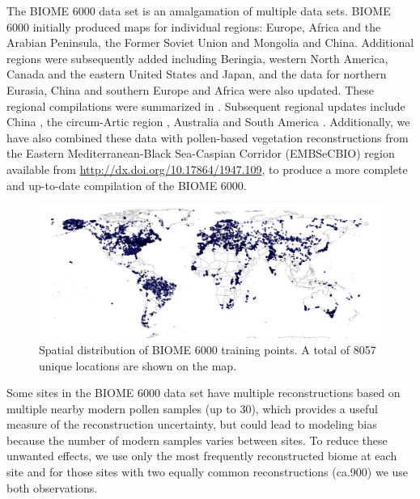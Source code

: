 \documentclass[fleqn,10pt,lineno]{wlpeerj} %
\begin{document}
The BIOME 6000 data set is an amalgamation of multiple data sets. BIOME 6000 initially produced maps for individual regions: Europe, Africa and the Arabian Peninsula, the Former Soviet Union and Mongolia and China. Additional regions were subsequently added including Beringia, western North America, Canada and the eastern United States and Japan, and the data for northern Eurasia, China and southern Europe and Africa were also updated. These regional compilations were summarized in \citet{prentice2000mid}. Subsequent regional updates include China \citep{harrison2001plant}, the circum-Artic region \citep{bigelow2003climate}, Australia \citep{pickett2004pollen} and South America \citep{marchant2009pollen}. Additionally, we have also combined these data with pollen-based vegetation reconstructions from the Eastern Mediterranean-Black Sea-Caspian Corridor (EMBSeCBIO) region \citep{marinova2018pollen} available from \url{http://dx.doi.org/10.17864/1947.109}, to produce a more complete and up-to-date compilation of the BIOME 6000. \par 

\begin{figure}[!hbt]
\centering
\includegraphics[width=\linewidth]{Fig_2.png}
\caption{Spatial distribution of BIOME 6000 training points. A total of 8057 unique locations are shown on the map.}
\label{Fig_biome_points_worldmap}
\end{figure}

Some sites in the BIOME 6000 data set have multiple reconstructions based on multiple nearby modern pollen samples (up to 30), which provides a useful measure of the reconstruction uncertainty, but could lead to modeling bias because the number of modern samples varies between sites. To reduce these unwanted effects, we use only the most frequently reconstructed biome at each site and for those sites with two equally common reconstructions (ca.\@ 900) we use both observations. \par
\end{document}
